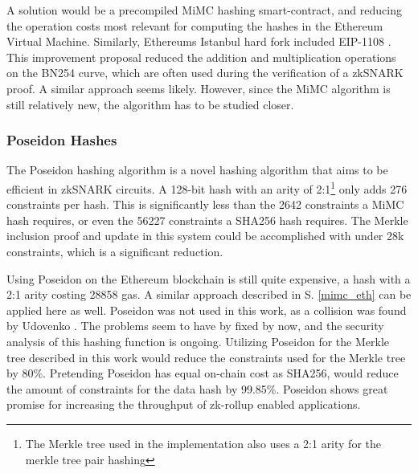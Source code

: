 \documentclass[../../thesis.tex]{subfiles}
\begin{document}
A solution would be a precompiled MiMC hashing smart-contract, and reducing the operation costs most relevant for computing the hashes in the Ethereum Virtual Machine. Similarly, Ethereums Istanbul hard fork included EIP-1108 \cite{eip_1108}. This improvement proposal reduced the addition and multiplication operations on the BN254 curve, which are often used during the verification of a zkSNARK proof. A similar approach seems likely. However, since the MiMC algorithm is still relatively new, the algorithm has to be studied closer. 

\subsubsection{Poseidon Hashes}
The Poseidon \cite{grassi2020poseidon} hashing algorithm is a novel hashing algorithm that aims to be efficient in zkSNARK circuits. A 128-bit hash with an arity of 2:1\footnote{The Merkle tree used in the implementation also uses a 2:1 arity for the merkle tree pair hashing} only adds 276 constraints per hash. This is significantly less than the 2642 constraints a MiMC hash requires, or even the 56227 constraints a SHA256 hash requires. The Merkle inclusion proof and update in this system could be accomplished with under 28k constraints, which is a significant reduction. 

Using Poseidon on the Ethereum blockchain is still quite expensive, a hash with a 2:1 arity costing 28858 gas. A similar approach described in S. \ref{mimc_eth} can be applied here as well. Poseidon was not used in this work, as a collision was found by Udovenko \cite{udovenko2020optimized}. The problems seem to have by fixed by now, and the security analysis of this hashing function is ongoing. Utilizing Poseidon for the Merkle tree described in this work would reduce the constraints used for the Merkle tree by 80\%. Pretending Poseidon has equal on-chain cost as SHA256, would reduce the amount of constraints for the data hash by 99.85\%. Poseidon shows great promise for increasing the throughput of zk-rollup enabled applications. 
\end{document}
